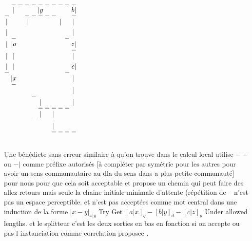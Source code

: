 \documentclass{article}
\begin{document}
${\scriptscriptstyle
\setlength{\arraycolsep}{1pt}
\renewcommand{\arraystretch}{0.45}
\begin{array}{@{}*{12}{c}@{}}
  & - & - & - & - & - & - & - & - & - &  - \\
  & | &   &   &   & | y&   &   &   &&b | &   \\
- &   &   & - & - & - & - & - &   & &- &   \\
| &   &   & | &   &   &   &   & | &   & | &\\
  &   &   &   &   &   &   &   &   &   &  & \\
| &   &   &   &   &   &   &   &   &   & | &\\
  & - &   &   &   &   &   &   &  & -  &  & \\
| & |a &   &   &   &   &   &   &   && z| &  \\
  &   &   &   &   &   &   &   &   & &- &   \\
| & | &   &   &   &   &   &   &   & &|    &\\
  &   &   &   &   &   &   &   &   &   &   &\\
| & | &   &   &   &   &   &   &   & &c|   & \\
- &   &   &   &   &   &   &   & & -  &  & \\
  & |x &   &   &   &   &   &   &   & &|   & \\
  & - &   &   &   &   &   &   &   &   &   &\\
  &   &   &   &   &   &   &   &   & &|    &\\
  &   &   &   & - &   &   &   &   &   &   &\\
  &   &   &   &   & | &   &   &   & &|    &\\
  &   &   &   &   & - & - & - & - & -  &  & \\
  &   &   &   &   & | &   & | &   &   &   &\\
  &   &   &   & - &   &   &   &   &   &  & \\
  &   &   &   &   &   &   & | &   &   &   &\\
  &   &   &   &   &   &   & - & - & - & - &\\
  &   &   &   &   &   &   &   &   &   &   &\\
  &   &   &   &   &   &   &   &   &   &   &\\
\end{array}
}$

Une bénédicte sans erreur similaire à qu'on trouve dans le calcul local  utilise $--$ ou $-|$ comme préfixe autorisés [à compléter par symétrie pour les autres pour avoir un sens communautaire au dla du sens dans a plus petite communauté] pour nous pour que cela soit acceptable
et propose un chemin  qui peut faire des allez retours mais seule la chaine initiale minimale d'attente (répétition de -- n'est pas un espace perceptible. et n'est pas acceptées comme mot central dans une induction de la forme $|x-y|_{x|y}$ Try Get  $[a|x]_q- [b|y]_d- [c|z]_{p}$ Under allowed lengths.
et le splitteur c'est les deux sorties en bas en fonction si on accepte ou pas l instanciation comme  correlation proposee .
\end{document}
